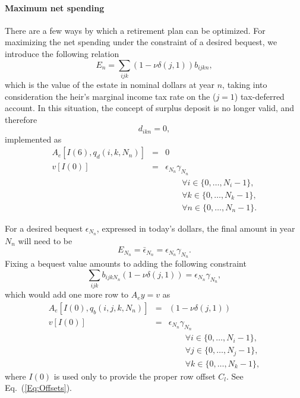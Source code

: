 \documentclass{report}[fleqn,12pt]
\begin{document}
\paragraph*{Maximum net spending}
There are a few ways by which a retirement plan can be optimized. For maximizing the net spending under
the constraint of a desired bequest, we introduce the following relation
\begin{equation}
	\label{Eq:Bequest}
	E_n = \sum_{ijk} (1 - \nu\delta(j, 1)) b_{ijkn},
\end{equation}
which is the value of the estate in nominal dollars at year $n$,
taking into consideration the heir's marginal income tax rate on the ($j=1$) tax-deferred account. 
In this situation, the concept of surplus deposit is no longer valid, and therefore
\begin{equation}
	d_{ikn} = 0,
\end{equation}
implemented as
\begin{eqnarray}
	A_e[I(6), q_d(i, k, N_n)] &=& 0 \nonumber \\
	v[I(0)] &=& \epsilon_{N_n}\gamma_{N_n} \\
	&&\qquad\forall i \in \{0,\ldots, N_i-1\},\nonumber\\
	&&\qquad\forall k \in \{0,\ldots, N_k-1\},\nonumber\\
	&&\qquad\forall n \in \{0,\ldots, N_n-1\}.\nonumber
\end{eqnarray}

For a desired bequest $\epsilon_{N_n}$, expressed in today's
dollars, the final amount in year $N_n$ will need to be
\begin{equation}
	E_{N_n} = \bar\epsilon_{N_n} = \epsilon_{N_n} \gamma_{N_n}.
\end{equation}
Fixing a bequest value amounts to adding the following constraint
\begin{equation}
	\sum_{ijk} b_{ijkN_n} (1 - \nu\delta(j, 1)) = \epsilon_{N_n} \gamma_{N_n},
\end{equation}
which would add one more row to $A_ey = v$ as
\begin{eqnarray}
	A_e[I(0), q_b(i, j, k, N_n)] &=& (1 - \nu\delta(j, 1)) \nonumber \\
	v[I(0)] &=& \epsilon_{N_n}\gamma_{N_n} \\
	&&\qquad\forall i \in \{0,\ldots, N_i-1\},\nonumber\\
	&&\qquad\forall j \in \{0,\ldots, N_j-1\},\nonumber\\
	&&\qquad\forall k \in \{0,\ldots, N_k-1\},\nonumber
\end{eqnarray}
where $I(0)$ is used only to provide the proper row offset $C_l$. See Eq.~(\ref{Eq:Offsets}).
\end{document}
